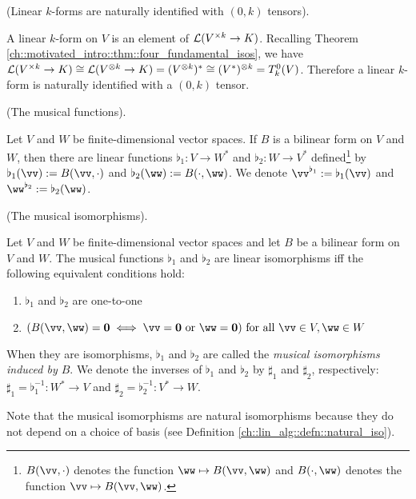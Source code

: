 \begin{remark}
\label{ch::bilinear_forms_metric_tensors::rmk::linear_k_forms_0_k_tensors}

    (Linear $k$-forms are naturally identified with $(0, k)$ tensors).
    
    A linear $k$-form on $V$ is an element of $\mathcal{L}(V^{\times k} \rightarrow K)$. Recalling Theorem \ref{ch::motivated_intro::thm::four_fundamental_isos}, we have $\mathcal{L}(V^{\times k} \rightarrow K) \cong \mathcal{L}(V^{\otimes k} \rightarrow K) = (V^{\otimes k})^* \cong (V^*)^{\otimes k} = T^0_k(V)$. Therefore a linear $k$-form is naturally identified with a $(0, k)$ tensor.
\end{remark}

\begin{defn}
\label{ch::bilinear_forms_metric_tensors::defn::nondegen_bilinear_form}
    (The musical functions).
    
    Let $V$ and $W$ be finite-dimensional vector spaces. If $B$ is a bilinear form on $V$ and $W$, then there are linear functions $\flat_1:V \rightarrow W^{*}$ and $\flat_2:W \rightarrow V^{*}$ defined\footnote{$B(\vv, \cdot)$ denotes the function $\ww \mapsto B(\vv, \ww)$ and $B(\cdot, \ww)$ denotes the function $\vv \mapsto B(\vv, \ww)$.} by $\flat_1(\vv) := B(\vv, \cdot)$ and $\flat_2(\ww) := B(\cdot, \ww)$. We denote $\vv^{\flat_1} := \flat_1(\vv)$ and $\ww^{\flat_2} := \flat_2(\ww)$.
\end{defn}

\begin{theorem}
    (The musical isomorphisms).

    Let $V$ and $W$ be finite-dimensional vector spaces and let $B$ be a bilinear form on $V$ and $W$. The musical functions $\flat_1$ and $\flat_2$ are linear isomorphisms iff the following equivalent conditions hold:

    \begin{enumerate}
        \item $\flat_1$ and $\flat_2$ are one-to-one
        \item $(B(\vv, \ww) = \mathbf{0} \iff \vv = \mathbf{0} \text{ or } \ww = \mathbf{0}) \text{ for all } \vv \in V, \ww \in W$
    \end{enumerate}

    When they are isomorphisms, $\flat_1$ and $\flat_2$ are called the \textit{musical isomorphisms induced by $B$}. We denote the inverses of $\flat_1$ and $\flat_2$ by $\sharp_1$ and $\sharp_2$, respectively: $\sharp_1 = \flat_1^{-1}:W^* \rightarrow V$ and $\sharp_2 = \flat_2^{-1}:V^* \rightarrow W$.

    Note that the musical isomorphisms are natural isomorphisms because they do not depend on a choice of basis (see Definition \ref{ch::lin_alg::defn::natural_iso}).
\end{theorem}

